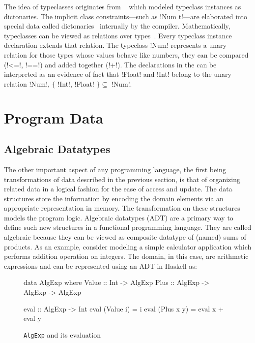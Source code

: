 \documentclass[screen,nonacm,manuscript,review]{acmart} %
\begin{document}
The idea of typeclasses originates from
~\citet{wadler_polymorphism_1989} which modeled typeclass instances as
dictonaries. The implicit class constraints---such as !Num t!---are
elaborated into special data called dictonaries~\cite{hall_type_1994} internally by the
compiler. Mathematically, typeclasses can be viewed as relations
over types~\cite{morris_simple_2014}. Every typeclass instance
declaration extends that relation. The typeclass !Num! represents a unary relation
for those types whose values behave like numbers, they can be compared
(!<=!, !==!) and added together (!+!). The declarations in the
 can be interpreted as an evidence of fact that
!Float! and !Int! belong to the unary relation !Num!,
$\{$ !Int!, !Float! $\} \subseteq$ !Num!.


\section{Program Data}
\subsection{Algebraic Datatypes}
The other important aspect of any programming language, the first
being transformations of data described in the previous section, is
that of organizing related data in a logical fashion for the ease of
access and update. The data structures store the information by
encoding the domain elements via an appropriate representation in
memory. The transformation on these structures models the program
logic. Algebraic datatypes (ADT) are a primary way
to define such new structures in a functional programming language. They are called
algebraic because they can be viewed as composite datatype of (named)
sums of products. As an example, consider modeling a simple calculator
application which performs addition operation on integers. The domain,
in this case, are arithmetic expressions and can be represented using an
ADT in Haskell as:
\begin{figure}
\begin{minipage}[ht]{0.5\linewidth}
\begin{CenteredBox}
\begin{code}
data AlgExp where
   Value :: Int    -> AlgExp
   Plus  :: AlgExp -> AlgExp -> AlgExp
\end{code}
\end{CenteredBox}
\end{minipage}%
\begin{minipage}[ht]{0.5\linewidth}
\begin{CenteredBox}
\begin{code}
eval :: AlgExp -> Int
eval (Value i) = i
eval (Plus x y) = eval x + eval y
\end{code}
\end{CenteredBox}
\end{minipage}
    \caption{\texttt{AlgExp} and its evaluation}
    \label{fig:algexp-data}
\end{figure}
\end{document}
